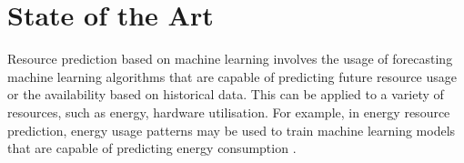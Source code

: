 \chapter{State of the Art}
\label{ch:state-of-the-art}
    
        Resource prediction based on machine learning involves the usage of forecasting machine learning algorithms that are capable of predicting future resource usage or the availability based on historical data.
        This can be applied to a variety of resources, such as energy, hardware utilisation.
        For example, in energy resource prediction, energy usage patterns may be used to train machine learning models that are capable of predicting energy consumption \cite{shapiEnergyConsumptionPrediction2021} \cite{richDeepMindAIReduces2016}.

